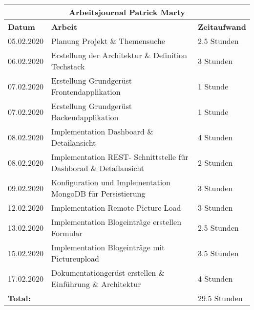 \documentclass[../main.tex]{subfiles}
\begin{document}
\begin{tabular}{ |p{3cm}| p{11cm}| p{3cm} |}
 \hline
 \multicolumn{3}{|c|}{Arbeitsjournal Patrick Marty} \\
 \hline
 \textbf{Datum} & \textbf{Arbeit} & \textbf{Zeitaufwand}\\
 \hline
 05.02.2020 &   Planung Projekt \& Themensuche                       & 2.5 Stunden\\ \hline
 06.02.2020 &   Erstellung der Architektur \& Definition Techstack  & 3 Stunden \\ \hline
 07.02.2020 &   Erstellung Grundgerüst Frontendapplikation          & 1 Stunde \\ \hline
 07.02.2020 &   Erstellung Grundgerüst Backendapplikation           & 1 Stunde \\ \hline
 08.02.2020 &   Implementation Dashboard \& Detailansicht           & 4 Stunden \\ \hline
 08.02.2020 &   Implementation REST- Schnittstelle für Dashborad \& Detailansicht & 2 Stunden \\ \hline
 09.02.2020 &   Konfiguration und Implementation MongoDB für Persistierung  & 3 Stunden \\ \hline
 12.02.2020 &   Implementation Remote Picture Load                  & 3 Stunden \\ \hline 
 13.02.2020 &   Implementation Blogeinträge erstellen Formular      & 2.5 Stunden \\ \hline
 15.02.2020 &   Implementation Blogeinträge mit Pictureupload       & 3.5 Stunden \\ \hline
 17.02.2020 &   Dokumentationgerüst erstellen \& Einführung \& Architektur  & 4 Stunden \\ \hline\hline
 \textbf{Total:} & & 29.5 Stunden \\ \hline
 
\end{tabular}
\end{document}
